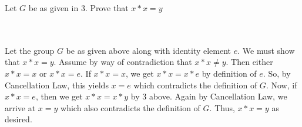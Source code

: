 Let $G$ be as given in 3. Prove that $x*x=y$\\\\

\begin{solution}\renewcommand{\qedsymbol}{}\ \\
    Let the group $G$ be as given above along with identity element $e$. We must show that $x*x=y$.
    Assume by way of contradiction that $x*x\neq y$. Then either $x*x=x$ or $x*x=e$. If $x*x=x$, we get
    $x*x=x*e$ by definition of $e$. So, by Cancellation Law, this yields $x=e$ which contradicts the
    definition of $G$. Now, if $x*x=e$, then we get $x*x=x*y$ by 3 above. Again by Cancellation Law, we
    arrive at $x=y$ which also contradicts the definition of $G$. Thus, $x*x=y$ as desired.

\end{solution}